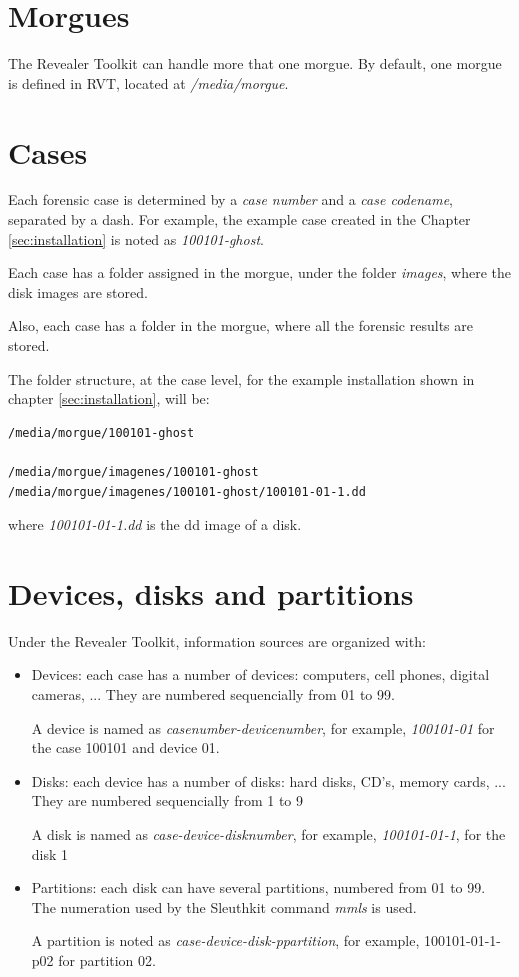 \documentclass[a4paper,11pt,oneside]{report}
\begin{document}
\section{Morgues}

The Revealer Toolkit can handle more that one morgue. By default, one morgue is defined in RVT, located at \emph{/media/morgue}. 



\section{Cases}

Each forensic case is determined by a \emph{case number} and a \emph{case codename}, separated by a dash. For example, the example case created in the Chapter \ref{sec:installation} is noted as \emph{100101-ghost}.

Each case has a folder assigned in the morgue, under the folder \emph{images}, where the disk images are stored.

Also, each case has a folder in the morgue, where all the forensic results are stored.

The folder structure, at the case level, for the example installation shown in chapter \ref{sec:installation}, will be:

\begin{verbatim}
/media/morgue/100101-ghost

/media/morgue/imagenes/100101-ghost
/media/morgue/imagenes/100101-ghost/100101-01-1.dd
\end{verbatim}

where \emph{100101-01-1.dd} is the dd image of a disk.


\section{Devices, disks and partitions}

Under the Revealer Toolkit, information sources are organized with:

\begin{itemize}
\item Devices: each case has a number of devices: computers, cell phones, digital cameras, ...   They are numbered sequencially from 01 to 99. 

A device is named as \emph{casenumber-devicenumber}, for example, \emph{100101-01} for the case 100101 and device 01.

\item Disks: each device has a number of disks: hard disks, CD's, memory cards, ... They are numbered sequencially from 1 to 9

A disk is named as \emph{case-device-disknumber}, for example, \emph{100101-01-1}, for the disk 1

\item Partitions:  each disk can have several partitions, numbered from 01 to 99. The numeration used by the Sleuthkit command \emph{mmls} is used.

A partition is noted as \emph{case-device-disk-ppartition}, for example, 100101-01-1-p02 for partition 02.
\end{itemize}
\end{document}
